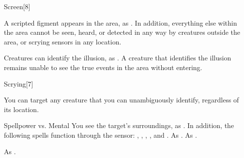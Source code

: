 \begin{spellsection}{Screen}[8]
    \begin{spellheader}
    \end{spellheader}
    \begin{spellcontent}
        \begin{spelltargetinginfo}
        \end{spelltargetinginfo}
        \begin{spelleffects}
            \spelleffect A scripted figment appears in the area, as . In addition, everything else within the area cannot be seen, heard, or detected in any way by creatures outside the area, or scrying sensors in any location.
            \spelldur \durext
        \end{spelleffects}
    \end{spellcontent}
    \begin{spellfooter}
        \spellnotes Creatures can identify the illusion, as . A creature that identifies the illusion remains unable to see the true events in the area without entering.
    \end{spellfooter}
\end{spellsection}

\begin{spellsection}[Greater]{Scrying}[7]
    \begin{spellheader}
    \end{spellheader}
    \begin{spellcontent}
        \begin{spelltargetinginfo}
        \end{spelltargetinginfo}
        \begin{spelleffects}
            \spellspecial You can target any creature that you can unambiguously identify, regardless of its location.
            \begin{spellattack}{Spellpower vs. Mental}
                \spellsuccess You see the target's surroundings, as . In addition, the following spells function through the sensor: , , , , and .
                \spellfailure As .
                \spellspecial As .
            \end{spellattack}
            \spelldur \durext \dismissable
        \end{spelleffects}
    \end{spellcontent}
    \begin{spellfooter}
        \spellnotes As .
    \end{spellfooter}
\end{spellsection}

